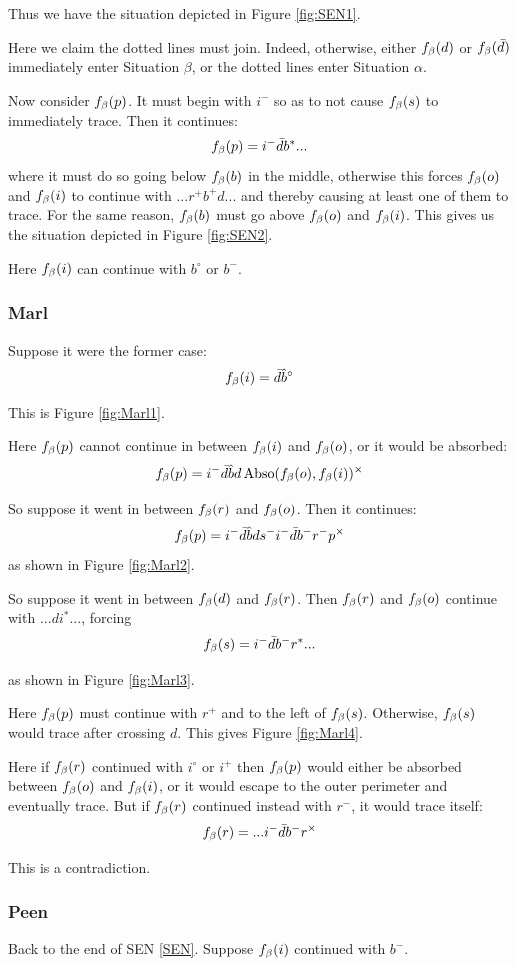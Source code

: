 Thus we have the situation depicted in Figure \ref{fig:SEN1}.

Here we claim the dotted lines must join. Indeed, otherwise, either $f_\beta(d)$ or $f_\beta(\bar{d})$ immediately enter Situation $\beta$, or the dotted lines enter Situation $\alpha$.

Now consider $f_\beta(p)$. It must begin with $i^-$ so as to not cause $f_\beta(s)$ to immediately trace. Then it continues:
\[
f_\beta(p) = i^- \bar{d} b^*...
\]
where it must do so going below $f_\beta(b)$ in the middle, otherwise this forces $f_\beta(o)$ and $f_\beta(i)$ to continue with $...r^+b^+ d...$ and thereby causing at least one of them to trace. For the same reason, $f_\beta(b)$ must go above $f_\beta(o)$ and $f_\beta(i)$. This gives us the situation depicted in Figure \ref{fig:SEN2}.

Here $f_\beta(i)$ can continue with $b^\circ$ or $b^-$.

\subsubsection{Marl}\label{Marl}
Suppose it were the former case:
\[
f_\beta(i) = \bar{d} \hat{b}^\circ
\]

This is Figure \ref{fig:Marl1}.

Here $f_\beta(p)$ cannot continue in between $f_\beta(i)$ and $f_\beta(o)$, or it would be absorbed:
\[
f_\beta(p) = i^- \bar{d} \hat{b} d \operatorname{Abso}(f_\beta(o), f_\beta(i))^\times
\]

So suppose it went in between $f_\beta(r)$ and $f_\beta(o)$. Then it continues:
\[
f_\beta(p) = i^- \bar{d} \hat{b} d s^- i^- \bar{d} b^- r^- p^\times
\]
as shown in Figure \ref{fig:Marl2}.

So suppose it went in between $f_\beta(d)$ and $f_\beta(r)$. Then $f_\beta(r)$ and $f_\beta(o)$ continue with $...di^*...$, forcing
\[
f_\beta(s) = i^- \bar{d} b^- r^*...
\]

as shown in Figure \ref{fig:Marl3}.

Here $f_\beta(p)$ must continue with $r^+$ and to the left of $f_\beta(s)$. Otherwise, $f_\beta(s)$ would trace after crossing $d$. This gives Figure \ref{fig:Marl4}.

Here if $f_\beta(r)$ continued with $i^\circ$ or $i^+$ then $f_\beta(p)$ would either be absorbed between $f_\beta(o)$ and $f_\beta(i)$, or it would escape to the outer perimeter and eventually trace. But if $f_\beta(r)$ continued instead with $r^-$, it would trace itself:
\[
f_\beta(r) = ...i^- \bar{d} b^- r^\times
\]

This is a contradiction.

\subsubsection{Peen}\label{Peen}
Back to the end of SEN \ref{SEN}. Suppose $f_\beta(i)$ continued with $b^-$.

